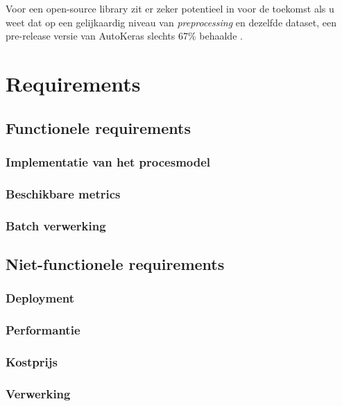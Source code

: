 Voor een open-source library zit er zeker potentieel in voor de toekomst als u weet dat op een gelijkaardig niveau van \textit{preprocessing} en dezelfde dataset, een pre-release versie van AutoKeras slechts 67\% behaalde \autocite{Chopra2019}.

\section{Requirements}

\subsection{Functionele requirements}
\label{subsec:autokeras-fr}

\subsubsection{Implementatie van het procesmodel}
\label{sucsubsec:autokeras-fr-procesmodel}

\subsubsection{Beschikbare metrics}
\label{sucsubsec:autokeras-fr-metrics}

\subsubsection{Batch verwerking}
\label{sucsubsec:autokeras-fr-batch}

\subsection{Niet-functionele requirements}
\label{subsec:autokeras-nfr} 

\subsubsection{Deployment}
\label{sucsubsec:autokeras-nfr-deployment}

\subsubsection{Performantie}
\label{sucsubsec:autokeras-nfr-performantie}

\subsubsection{Kostprijs}
\label{sucsubsec:autokeras-nfr-price}

\subsubsection{Verwerking}
\label{sucsubsec:autokeras-nfr-verwerking}